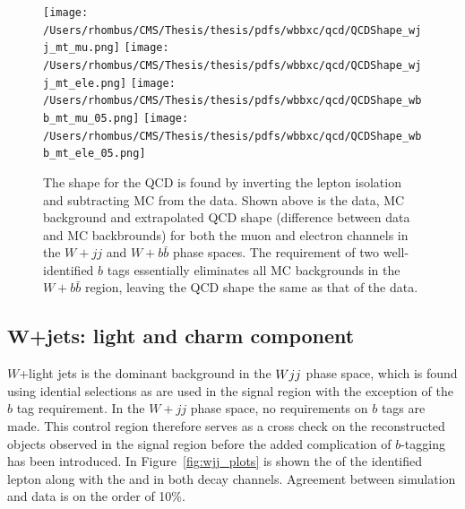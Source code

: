 \begin{figure}
 \caption[QCD shape for \wbb analysis]
 {The shape for the QCD is found by inverting the lepton
  isolation and subtracting MC from the data.
  Shown above is the data, MC background and 
   extrapolated QCD shape (difference between data
   and MC backbrounds) for both the muon and electron channels
   in the $W+jj$ and $W+b\bar{b}$ phase spaces.
  The requirement of two well-identified $b$ tags
   essentially eliminates all MC backgrounds in
   the $W+b\bar{b}$ region, leaving the QCD shape 
   the same as that of the data.
  }
 \center
\label{fig:qcd_mu}\texttt{[image: /Users/rhombus/CMS/Thesis/thesis/pdfs/wbbxc/qcd/QCDShape\_wjj\_mt\_mu.png]}
\label{fig:qcd_mu}\texttt{[image: /Users/rhombus/CMS/Thesis/thesis/pdfs/wbbxc/qcd/QCDShape\_wjj\_mt\_ele.png]}
\label{fig:qcd_mu}\texttt{[image: /Users/rhombus/CMS/Thesis/thesis/pdfs/wbbxc/qcd/QCDShape\_wbb\_mt\_mu\_05.png]}
\label{fig:qcd_mu}\texttt{[image: /Users/rhombus/CMS/Thesis/thesis/pdfs/wbbxc/qcd/QCDShape\_wbb\_mt\_ele\_05.png]}
 \label{fig:qcdshape}
\end{figure}


\subsection[$W$+jets: light and charm component]
{$\boldsymbol{W}$+jets: light and charm component}

$W$+light jets is the dominant background in the $W jj$ phase space,
 which is found using idential selections as are used in 
 the signal region with the exception of the $b$ tag requirement.
In the $W+jj$ phase space, no requirements on $b$ tags are made.
This control region therefore serves as a cross check on the 
 reconstructed objects observed in the signal region before
 the added complication of $b$-tagging has been introduced. 
In Figure~\ref{fig:wjj_plots} is shown the \pt 
 of the identified lepton along with the \met and \mt
 in both decay channels.
Agreement between simulation and data is on the order of 10\%.

